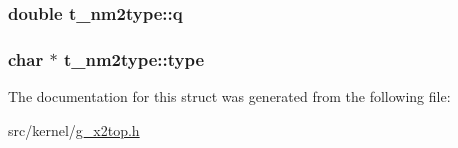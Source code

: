 \hypertarget{structt__nm2type_a9480c9e3b30e1c9b49b1cf289258cccf}{
\subsubsection[{q}]{\setlength{\rightskip}{0pt plus 5cm}double {\bf t\-\_\-nm2type\-::q}}}\label{structt__nm2type_a9480c9e3b30e1c9b49b1cf289258cccf}
\hypertarget{structt__nm2type_afd16b6381be327ff490a062cbce1ad0f}{
\subsubsection[{type}]{\setlength{\rightskip}{0pt plus 5cm}char $\ast$ {\bf t\-\_\-nm2type\-::type}}}\label{structt__nm2type_afd16b6381be327ff490a062cbce1ad0f}


\-The documentation for this struct was generated from the following file\-:\begin{DoxyCompactItemize}
\item 
src/kernel/\hyperlink{g__x2top_8h}{g\-\_\-x2top.\-h}\end{DoxyCompactItemize}
